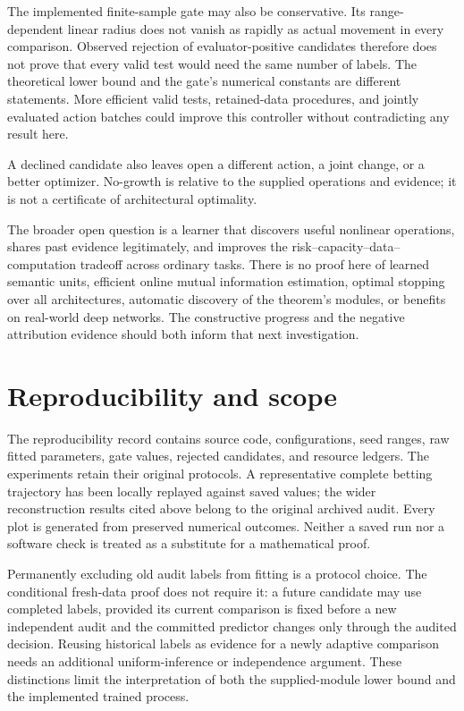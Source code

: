 \documentclass[11pt]{article}
\theoremstyle{remark}\newtheorem{remark}[theorem]{Remark}
\begin{document}
The implemented finite-sample gate may also be conservative. Its
range-dependent linear radius does not vanish as rapidly as actual movement
in every comparison. Observed rejection of evaluator-positive candidates
therefore does not prove that every valid test would need the same number of
labels. The theoretical lower bound and the gate's numerical constants are
different statements. More efficient valid tests, retained-data procedures,
and jointly evaluated action batches could improve this controller without
contradicting any result here.

A declined candidate also leaves open a different action, a joint change, or a
better optimizer. No-growth is relative to the supplied operations and evidence;
it is not a certificate of architectural optimality.

The broader open question is a learner that
discovers useful nonlinear operations, shares past evidence legitimately,
and improves the risk--capacity--data--computation tradeoff across ordinary
tasks. There is no proof here of learned semantic units, efficient online
mutual information estimation, optimal stopping over all architectures,
automatic discovery of the theorem's modules, or benefits on real-world deep
networks. The constructive progress and the negative attribution evidence
should both inform that next investigation.

\section{Reproducibility and scope}
The reproducibility record contains source code, configurations, seed ranges,
raw fitted parameters, gate values, rejected candidates, and resource ledgers.
The experiments retain their original protocols. A representative complete
betting trajectory has been locally replayed against saved values; the wider
reconstruction results cited above belong to the original archived audit.
Every plot is generated from preserved numerical outcomes. Neither a saved
run nor a software check is treated as a substitute for a mathematical proof.

Permanently excluding old audit labels from fitting is a protocol choice.
The conditional fresh-data proof does not require it: a future candidate may
use completed labels, provided its current comparison is fixed before a new
independent audit and the committed predictor changes only through the
audited decision. Reusing historical labels as evidence for a newly adaptive
comparison needs an additional uniform-inference or independence argument.
These distinctions limit the interpretation of both the supplied-module
lower bound and the implemented trained process.



\end{document}
